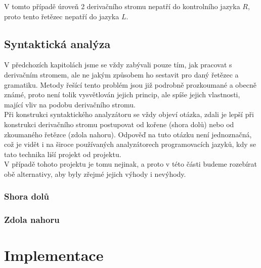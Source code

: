 \begin{exmp}
  \noindent
  V tomto případě úroveň 2 derivačního stromu nepatří do kontrolního jazyka $R$,
  proto tento řetězec nepatří do jazyka $L$.
\end{exmp}

\section{Syntaktická analýza}
V předchozích kapitolách jsme se vždy zabývali pouze tím, jak pracovat s derivačním stromem,
ale ne jakým způsobem ho sestavit pro daný řetězec a gramatiku.
Metody řešící tento problém jsou již podrobně prozkoumané a obecně známé,
proto není tolik vysvětlován jejich princip, ale spíše jejich vlastnosti, mající
vliv na podobu derivačního stromu.\\

Při konstrukci syntaktického analyzátoru se vždy objeví otázka, zdali je lepší
při konstrukci derivačního stromu postupovat od kořene (shora dolů) nebo od
zkoumaného řetězce (zdola nahoru). Odpověď na tuto otázku není jednoznačná,
což je vidět i na široce používaných analyzátorech programovacích jazyků,
kdy se tato technika liší projekt od projektu.\\

V případě tohoto projektu je tomu nejinak, a proto v této části budeme rozebírat
obě alternativy, aby byly zřejmé jejich výhody i nevýhody.

\subsection{Shora dolů}

\subsection{Zdola nahoru}
\chapter{Implementace}

